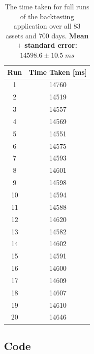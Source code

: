 \documentclass{article}
\begin{document}
\begin{center}
\begin{table}[H]
\begin{tabular}{|c c|} 
\hline
Run & Time Taken [ms]  \\ [0.5ex] 
\hline\hline
1 & 14760 \\
\hline
2 & 14519 \\
\hline
3 & 14557 \\
\hline
4 & 14569 \\
\hline
5 & 14551 \\
\hline
6 & 14575 \\
\hline
7 & 14593 \\
\hline
8 & 14601 \\
\hline
9 & 14598 \\
\hline
10 & 14594 \\
\hline
11 & 14588 \\
\hline
12 & 14620 \\
\hline
13 & 14582 \\
\hline
14 & 14602 \\
\hline
15 & 14591 \\
\hline
16 & 14600 \\
\hline
17 & 14609 \\
\hline
18 & 14607 \\
\hline
19 & 14610 \\
\hline
20 & 14646 \\ [1ex] 
\hline
\end{tabular}
\caption{The time taken for full runs of the backtesting application over all 83 assets and 700 days. \textbf{Mean} $\pm$ \textbf{ standard error: } $14598.6 \pm 10.5\;ms$}
\end{table}
\end{center}

\subsection{Code} 
\label{sec:code}
\end{document}
